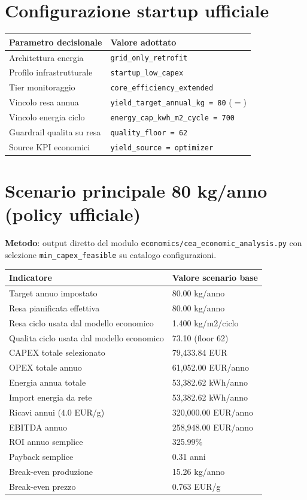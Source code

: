 \documentclass[11pt,a4paper]{article}
\begin{document}
\section*{Configurazione startup ufficiale}
\begin{longtable}{@{}p{6.2cm}p{5.8cm}@{}}
\toprule
Parametro decisionale & Valore adottato \\ \midrule
Architettura energia & \texttt{grid\_only\_retrofit} \\
Profilo infrastrutturale & \texttt{startup\_low\_capex} \\
Tier monitoraggio & \texttt{core\_efficiency\_extended} \\
Vincolo resa annua & \texttt{yield\_target\_annual\_kg = 80} (\(=\)) \\
Vincolo energia ciclo & \texttt{energy\_cap\_kwh\_m2\_cycle = 700} \\
Guardrail qualita su resa & \texttt{quality\_floor = 62} \\
Source KPI economici & \texttt{yield\_source = optimizer} \\
\bottomrule
\end{longtable}

\section*{Scenario principale 80 kg/anno (policy ufficiale)}
\textbf{Metodo}: output diretto del modulo \texttt{economics/cea\_economic\_analysis.py} con selezione
\texttt{min\_capex\_feasible} su catalogo configurazioni.

\begin{longtable}{@{}p{6.6cm}p{5.6cm}@{}}
\toprule
Indicatore & Valore scenario base \\ \midrule
Target annuo impostato & 80.00 kg/anno \\
Resa pianificata effettiva & 80.00 kg/anno \\
Resa ciclo usata dal modello economico & 1.400 kg/m2/ciclo \\
Qualita ciclo usata dal modello economico & 73.10 (floor 62) \\
CAPEX totale selezionato & 79,433.84 EUR \\
OPEX totale annuo & 61,052.00 EUR/anno \\
Energia annua totale & 53,382.62 kWh/anno \\
Import energia da rete & 53,382.62 kWh/anno \\
Ricavi annui (\(4.0\) EUR/g) & 320,000.00 EUR/anno \\
EBITDA annuo & 258,948.00 EUR/anno \\
ROI annuo semplice & 325.99\% \\
Payback semplice & 0.31 anni \\
Break-even produzione & 15.26 kg/anno \\
Break-even prezzo & 0.763 EUR/g \\
\bottomrule
\end{longtable}
\end{document}

